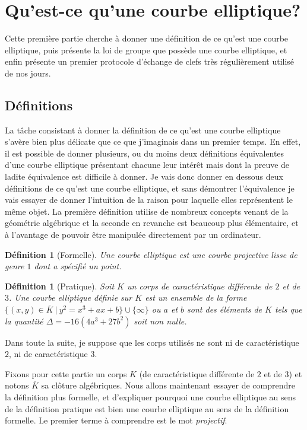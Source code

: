 \documentclass{article}
\theoremstyle{plain}%
\newtheorem{deff}[thm]{Définition}
\theoremstyle{definition}%
\newcommand{\ol}{\overline}
\begin{document}
\section{Qu'est-ce qu'une courbe elliptique?}

Cette première partie cherche à donner une définition de ce qu'est une courbe elliptique, puis présente la loi de groupe que possède une courbe elliptique, et enfin présente un premier protocole d'échange de clefs très régulièrement utilisé de nos jours.


\subsection{Définitions}

La tâche consistant à donner la définition de ce qu'est une courbe elliptique s'avère bien plus délicate que ce que j'imaginais dans un premier temps. En effet, il est possible de donner plusieurs, ou du moins deux définitions équivalentes d'une courbe elliptique présentant chacune leur intérêt mais dont la preuve de ladite équivalence est difficile à donner. Je vais donc donner en dessous deux définitions de ce qu'est une courbe elliptique, et sans démontrer l'équivalence je vais essayer de donner l'intuition de la raison pour laquelle elles représentent le même objet. La première définition utilise de nombreux concepts venant de la géométrie algébrique et la seconde en revanche est beaucoup plus élémentaire, et à l'avantage de pouvoir être manipulée directement par un ordinateur.

\begin{deff}[Formelle]
  Une courbe elliptique est une courbe projective lisse de genre $1$ dont a spécifié un point.
\end{deff}

\begin{deff}[Pratique]
  Soit $K$ un corps de caractéristique différente de $2$ et de $3$. Une courbe elliptique définie sur $K$ est un ensemble de la forme $\{(x, y)\in\ol K\ |\ y^2 = x^3 + ax +b\}\cup\{\infty\}$ ou $a$ et $b$ sont des éléments de $K$ tels que la quantité $\Delta =-16(4a^3+ 27b^2)$ soit non nulle.
\end{deff}

\begin{center}
  \color{red}
  Dans toute la suite, je suppose que les corps utilisés ne sont ni de caractéristique $2$, ni de caractéristique $3$.
\end{center}

Fixons pour cette partie un corps $K$ (de caractéristique différente de $2$ et de $3$) et notons $\overline{K}$ sa clôture algébriques. Nous allons maintenant essayer de comprendre la définition plus formelle, et d'expliquer pourquoi une courbe elliptique au sens de la définition pratique est bien une courbe elliptique au sens de la définition formelle. Le premier terme à comprendre est le mot \emph{projectif}.
\end{document}
